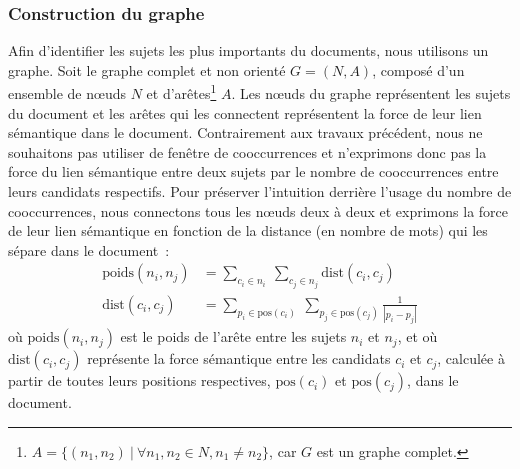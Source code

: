       \subsubsection{Construction du graphe}
      \label{subsubsec:main:domain_independent_keyphrase_extraction-unsupervised_automatic_keyphrase_extraction-topicrank-graph_construction}
        Afin d'identifier les sujets les plus importants du documents, nous
        utilisons un graphe.
        Soit le graphe complet et non orienté $G = (N, A)$, composé d'un
        ensemble de n\oe{}uds $N$ et d'arêtes\footnote{$A = \{(n_1, n_2)\ |\
        \forall{n_1, n_2 \in N}, n_1 \neq n_2\}$, car $G$ est un graphe
        complet.} $A$. Les n\oe{}uds du graphe représentent les sujets du
        document et les arêtes qui les connectent représentent la force de leur
        lien sémantique dans le document. Contrairement aux travaux précédent,
        nous ne souhaitons pas utiliser de fenêtre de cooccurrences et
        n'exprimons donc pas la force du lien sémantique entre deux sujets par
        le nombre de cooccurrences entre leurs candidats respectifs. Pour
        préserver l'intuition derrière l'usage du nombre de cooccurrences, nous
        connectons tous les n\oe{}uds deux à deux et exprimons la force de leur
        lien sémantique en fonction de la distance (en nombre de mots) qui les
        sépare dans le document~:
        \begin{align}
          \text{poids}(n_i, n_j) &= \sum_{c_i \in n_i}\ \sum_{c_j \in n_j} \text{dist}(c_i, c_j) \label{math:ponderation}\\
          \text{dist}(c_i, c_j) &= \sum_{p_i \in \text{pos}(c_i)}\ \sum_{p_j \in \text{pos}(c_j)} \frac{1}{|p_i - p_j|} \label{math:distance}
        \end{align}
        où $\text{poids}(n_i, n_j)$ est le poids de l'arête entre les sujets
        $n_i$ et $n_j$, et où $\text{dist}(c_i, c_j)$ représente la force
        sémantique entre les candidats $c_i$ et $c_j$, calculée à partir de
        toutes leurs positions respectives, $\text{pos}(c_i)$ et
        $\text{pos}(c_j)$, dans le document.

